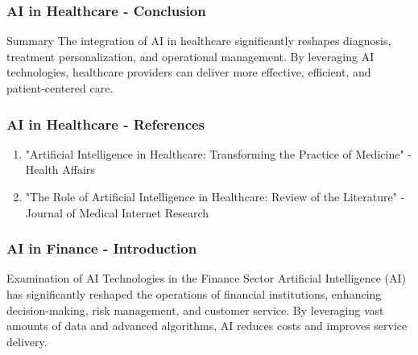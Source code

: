 \documentclass{beamer}
\begin{document}
\begin{frame}[fragile]
    \frametitle{AI in Healthcare - Conclusion}
    \begin{block}{Summary}
        The integration of AI in healthcare significantly reshapes diagnosis, treatment personalization, and operational management. 
        By leveraging AI technologies, healthcare providers can deliver more effective, efficient, and patient-centered care.
    \end{block}
\end{frame}

\begin{frame}[fragile]
    \frametitle{AI in Healthcare - References}
    \begin{enumerate}
        \item "Artificial Intelligence in Healthcare: Transforming the Practice of Medicine" - Health Affairs
        \item "The Role of Artificial Intelligence in Healthcare: Review of the Literature" - Journal of Medical Internet Research
    \end{enumerate}
\end{frame}

\begin{frame}[fragile]
    \frametitle{AI in Finance - Introduction}
    \begin{block}{Examination of AI Technologies in the Finance Sector}
        Artificial Intelligence (AI) has significantly reshaped the operations of financial institutions, enhancing decision-making, risk management, and customer service. By leveraging vast amounts of data and advanced algorithms, AI reduces costs and improves service delivery.
    \end{block}
\end{frame}
\end{document}
